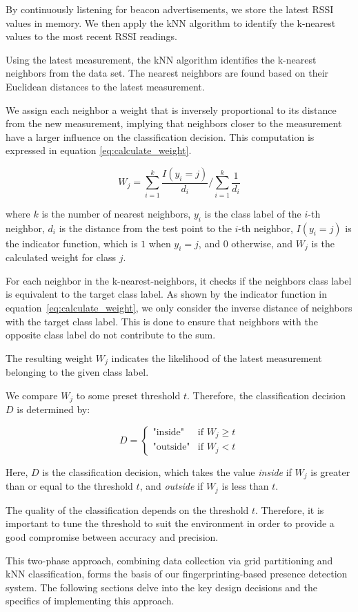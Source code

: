 By continuously listening for beacon advertisements, we store the latest RSSI values in memory. 
We then apply the kNN algorithm to identify the k-nearest values to the most recent RSSI readings.

Using the latest measurement, the kNN algorithm identifies the k-nearest neighbors from the data set. 
The nearest neighbors are found based on their Euclidean distances to the latest measurement.

We assign each neighbor a weight that is inversely proportional to its distance from the new measurement, implying that neighbors closer to the measurement have a larger influence on the classification decision.
This computation is expressed in equation \ref{eq:calculate_weight}.

\begin{equation}\label{eq:calculate_weight}
W_j = \sum_{i=1}^{k} \frac{I(y_i = j)}{d_i} \Bigg/ \sum_{i=1}^{k} \frac{1}{d_i}
\end{equation}

where $k$ is the number of nearest neighbors, $y_i$ is the class label of the $i$-th neighbor, $d_i$ is the distance from the test point to the $i$-th neighbor, $I(y_i=j)$ is the indicator function, which is $1$ when $y_i=j$, and $0$ otherwise, and $W_j$ is the calculated weight for class $j$.

For each neighbor in the k-nearest-neighbors, it checks if the neighbors class label is equivalent to the target class label. As shown by the indicator function in equation~\ref{eq:calculate_weight}, we only consider the inverse distance of neighbors with the target class label. This is done to ensure that neighbors with the opposite class label do not contribute to the sum.

The resulting weight $W_j$ indicates the likelihood of the latest measurement belonging to the given class label.

We compare $W_j$ to some preset threshold $t$. Therefore, the classification decision $D$ is determined by:

$$
D = 
\begin{cases}
\text{"inside"} & \text{if } W_j \geq t \\
\text{"outside"} & \text{if } W_j < t 
\end{cases}
$$

Here, $D$ is the classification decision, which takes the value \textit{inside} if $W_j$ is greater than or equal to the threshold $t$, and \textit{outside} if $W_j$ is less than $t$.

The quality of the classification depends on the threshold $t$.
Therefore, it is important to tune the threshold to suit the environment in order to provide a good compromise between accuracy and precision.

This two-phase approach, combining data collection via grid partitioning and kNN classification, forms the basis of our fingerprinting-based presence detection system.
The following sections delve into the key design decisions and the specifics of implementing this approach.